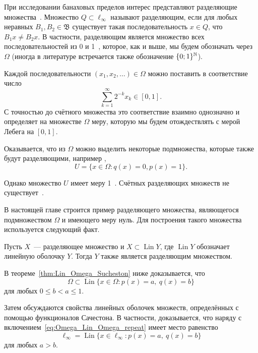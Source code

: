 При исследовании банаховых пределов интерес представляют разделяющие множества~\cite[\S 3]{Semenov2014geomprops}.
Множество $Q\subset\ell_\infty$ называют разделяющим, если
для любых неравных $B_1, B_2\in\mathfrak{B}$ существует такая последовательность $x\in Q$,
что $B_1 x \neq B_2 x$.
В частности, разделяющим является множество всех последовательностей из 0 и 1~\cite{semenov2010characteristic},
которое, как и выше, мы будем обозначать через $\Omega$
(иногда в литературе встречается также обозначение $\{0;1\}^{\mathbb{N}}$).

Каждой последовательности $(x_1, x_2, \dots)\in \Omega$ можно поставить в соответствие число
\begin{equation}\label{eq:bijection_omega_0_1}
	\sum_{k=1}^\infty 2^{-k} x_k \in [0,1]
	.
\end{equation}
С точностью до счётного множества это соответствие взаимно однозначно и определяет на множестве $\Omega$ меру,
которую мы будем отождествлять с мерой Лебега на $[0,1]$.

Оказывается, что из $\Omega$ можно выделить некоторые подмножества, которые также будут разделяющими,
например \cite[\S 3, Теорема 11]{Semenov2014geomprops},
\begin{equation}
	U = \{ x\in\Omega: q(x) = 0, p(x) = 1 \}
	.
\end{equation}

Однако множество $U$ имеет меру 1~\cite{semenov2010characteristic}.
Счётных разделяющих множеств не существует~\cite[{следствие 22}]{Semenov2014geomprops}.

В настоящей главе строится пример разделяющего множества,
являющегося подмножеством $\Omega$ и имеющего меру нуль.
Для построения такого множества используется следующий факт.

\begin{lemma}
	Пусть $X$~--- разделяющее множество и $X \subset \operatorname{Lin} Y$,
	где $\operatorname{Lin} Y$ обозначает линейную оболочку $Y$.
	Тогда $Y$ также является разделяющим множеством.
\end{lemma}

В теореме~\ref{thm:Lin_Omega_Sucheston} ниже доказывается, что
\begin{equation}
	\label{eq:Omega_Lin_Omega_repeat}
	\Omega \subset \operatorname{Lin}\{x\in\Omega : p(x) = a,~ q(x) = b\}
\end{equation}
для любых $0\leq b < a \leq 1$.

Затем обсуждаются свойства линейных оболочек множеств, определённых с помощью функционалов Сачестона.
В частности, доказывается,
что наряду с включением~\eqref{eq:Omega_Lin_Omega_repeat}
имеет место равенство
\begin{equation}
	\ell_\infty = \operatorname{Lin}\{x\in\ell_\infty : p(x) = a,~ q(x) = b\}
\end{equation}
для любых $a>b$.

